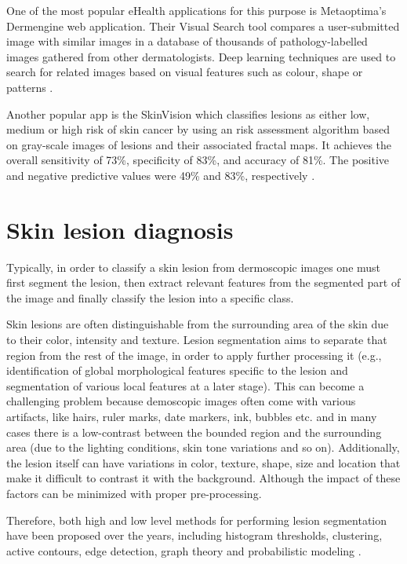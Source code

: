One of the most popular eHealth applications for this purpose is Metaoptima's Dermengine web application. Their Visual Search tool compares a user-submitted image with similar images in a database of thousands of pathology-labelled images gathered from  other dermatologists. Deep learning techniques are used to search for related images based on visual features such as colour, shape or patterns \cite{dermengine}. \par

Another popular app is the SkinVision which classifies lesions as either low, medium or high risk of skin cancer by using an risk assessment algorithm based on gray-scale images of lesions and their associated fractal maps. It achieves the overall sensitivity of 73\%, specificity of 83\%, and accuracy of 81\%. The positive and negative predictive values were 49\% and 83\%, respectively \cite{Jaworek-Korjakowska2018}. \par

\section{Skin lesion diagnosis}
Typically, in order to classify a skin lesion from dermoscopic images one must first segment the lesion, then extract relevant features from the segmented part of the image and finally classify the lesion into a specific class. \par

Skin lesions are often distinguishable from the surrounding area of the skin due to their color, intensity and texture. Lesion segmentation aims to separate that region from the rest of the image, in order to apply further processing it (e.g., identification of global morphological features specific to the lesion and segmentation of various local features at a later stage). This can become a challenging problem because  demoscopic images often come with various artifacts, like hairs, ruler marks, date markers, ink, bubbles etc. and in many cases there is a low-contrast between the bounded region and the surrounding area (due to the lighting conditions, skin tone variations and so on). Additionally, the lesion itself can have variations in color, texture, shape, size and location that make it difficult to contrast it with the background. Although the impact of these factors can be minimized with proper pre-processing.  \par

Therefore, both high and low level methods for performing lesion segmentation have been proposed over the years, including histogram thresholds, clustering, active contours, edge detection, graph theory and probabilistic modeling \cite{?}. \par

